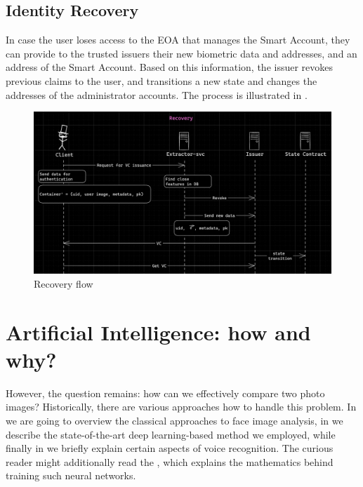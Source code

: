 \documentclass[a4, 14pt]{extarticle}
\begin{document}
\subsection{Identity Recovery}\label{flow:recovery}

In case the user loses access to the EOA that manages the Smart Account, they can provide to the trusted issuers their new biometric data and addresses, and an address of the Smart Account. Based on this information, the issuer revokes previous claims to the user, and transitions a new state and changes the addresses of the administrator accounts. The process is illustrated in .

\begin{figure}
    \centering
    \includegraphics[width=\textwidth]{images/recovery_flow-modified.png}
    \caption{Recovery flow}
    \label{fig:recovery}
\end{figure}

\section{Artificial Intelligence: how and why?}
However, the question remains: how can we effectively compare two photo images? Historically, there are various approaches how to handle this problem. In  we are going to overview the classical approaches to face image analysis, in  we describe the state-of-the-art deep learning-based method we employed, while finally in  we briefly explain certain aspects of voice recognition. The curious reader might additionally read the , which explains the mathematics behind training such neural networks.
\end{document}

